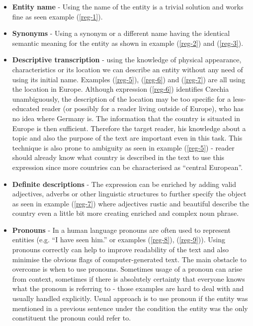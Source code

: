 \begin{itemize}
	\item \textbf{Entity name} - Using the name of the entity is a trivial solution and works fine as seen example (\ref{reg-1}).
	\item \textbf{Synonyms} - Using a synonym or a different name having the identical semantic meaning for the entity as shown in example (\ref{reg-2}) and (\ref{reg-3}). 
	\item \textbf{Descriptive transcription}  - using the knowledge of physical appearance, characteristics or its location we can describe an entity without any need of using its initial name. Examples (\ref{reg-5}), (\ref{reg-6}) and (\ref{reg-7}) are all using the location in Europe. Although expression (\ref{reg-6}) identifies Czechia unambiguously, the description of the location may be too specific for a less-educated reader (or possibly for a reader living outside of Europe), who has no idea where Germany is. The information that the country is situated in Europe is then sufficient. Therefore the target reader, his knowledge about a topic and also the purpose of the text are important even in this task. This technique is also prone to ambiguity as seen in example (\ref{reg-5}) - reader should already know what country is described in the text to use this expression since more countries can be characterised as “central European”.
	\item \textbf{Definite descriptions} - The expression can be enriched by adding valid adjectives, adverbs or other linguistic structures to further specify the object as seen in example (\ref{reg-7}) where adjectives rustic and beautiful describe the country even a little bit more creating enriched and complex noun phrase.
	\item \textbf{Pronouns} - In a human language pronouns are often used to represent entities (e.g. “I have seen him.” or examples (\ref{reg-8}), (\ref{reg-9})). Using pronouns correctly can help to improve readability of the text and also minimise the obvious flags of computer-generated text. The main obstacle to overcome is when to use pronouns. Sometimes usage of a pronoun can arise from context, sometimes if there is absolutely certainty that everyone knows what the pronoun is referring to - those examples are hard to deal with and usually handled explicitly. Usual approach is to use pronoun if the entity was mentioned in a previous sentence under the condition the entity was the only constituent the pronoun could refer to.
\end{itemize}

